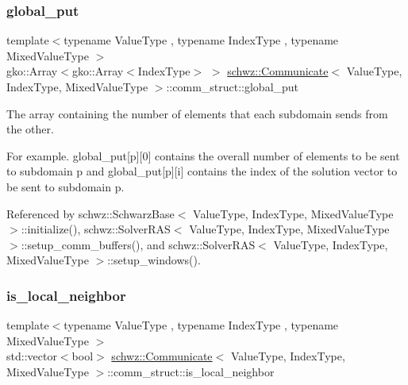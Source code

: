 \mbox{\label{structschwz_1_1Communicate_1_1comm__struct_aa359ee58c0e15abd8f63695c05e436ea}} 
\subsubsection{\texorpdfstring{global\+\_\+put}{global\_put}}
{\footnotesize\ttfamily template$<$typename Value\+Type , typename Index\+Type , typename Mixed\+Value\+Type $>$ \\
gko\+::\+Array$<$gko\+::\+Array$<$Index\+Type$>$ $>$ \hyperlink{classschwz_1_1Communicate}{schwz\+::\+Communicate}$<$ Value\+Type, Index\+Type, Mixed\+Value\+Type $>$\+::comm\+\_\+struct\+::global\+\_\+put}



The array containing the number of elements that each subdomain sends from the other. 

For example. global\+\_\+put\mbox{[}p\mbox{]}\mbox{[}0\mbox{]} contains the overall number of elements to be sent to subdomain p and global\+\_\+put\mbox{[}p\mbox{]}\mbox{[}i\mbox{]} contains the index of the solution vector to be sent to subdomain p. 

Referenced by schwz\+::\+Schwarz\+Base$<$ Value\+Type, Index\+Type, Mixed\+Value\+Type $>$\+::initialize(), schwz\+::\+Solver\+R\+A\+S$<$ Value\+Type, Index\+Type, Mixed\+Value\+Type $>$\+::setup\+\_\+comm\+\_\+buffers(), and schwz\+::\+Solver\+R\+A\+S$<$ Value\+Type, Index\+Type, Mixed\+Value\+Type $>$\+::setup\+\_\+windows().

\mbox{\label{structschwz_1_1Communicate_1_1comm__struct_ae36319cfa4fc09154135a2b121377d3b}} 
\subsubsection{\texorpdfstring{is\+\_\+local\+\_\+neighbor}{is\_local\_neighbor}}
{\footnotesize\ttfamily template$<$typename Value\+Type , typename Index\+Type , typename Mixed\+Value\+Type $>$ \\
std\+::vector$<$bool$>$ \hyperlink{classschwz_1_1Communicate}{schwz\+::\+Communicate}$<$ Value\+Type, Index\+Type, Mixed\+Value\+Type $>$\+::comm\+\_\+struct\+::is\+\_\+local\+\_\+neighbor}



